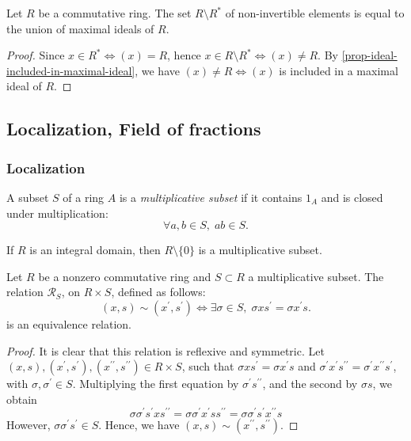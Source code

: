 \documentclass[12pt]{report}
\begin{document}
\begin{corollary} \label{cor-invertible-element-in-maximal-ideal}
    Let $R$ be a commutative ring. The set $R \setminus R^{\ast}$ of non-invertible elements is equal to the union of maximal ideals of $R$.
\end{corollary}

\begin{proof}
    Since $x \in R^{\ast} \iff (x) = R$, hence $x \in R \setminus R^{\ast} \iff (x) \neq R$. By \ref{prop-ideal-included-in-maximal-ideal}, we have $(x) \neq R \iff (x)$ is included in a maximal ideal of $R$.
\end{proof}

\subsection{Localization, Field of fractions}
\subsubsection{Localization}

\begin{definition} \label{def-ring-multiplicative-subset}
    A subset $S$ of a ring $A$ is a \emph{multiplicative subset} if it contains $1_A$ and is closed under multiplication:
    \[
        \forall a, b \in S, \; ab \in S.
    \]
\end{definition}

\begin{remark}
    If $R$ is an integral domain, then $R \setminus \lbrace 0 \rbrace$ is a multiplicative subset.
\end{remark}

\begin{proposition} \label{prop-ring-localization-relation}
    Let $R$ be a nonzero commutative ring and $S \subset R$ a multiplicative subset. The relation $\mathcal{R}_S$, on $R \times S$, defined as follows:
    \[
        (x, s) \sim (x^{\prime}, s^{\prime}) \iff \exists \sigma \in S, \; \sigma x s^{\prime} = \sigma x^{\prime} s.
    \]
    is an equivalence relation.
\end{proposition}

\begin{proof}
    It is clear that this relation is reflexive and symmetric. Let $(x, s), (x^{\prime}, s^{\prime}), (x^{\prime \prime}, s^{\prime \prime}) \in R \times S$, such that $\sigma x s^{\prime} = \sigma x^{\prime} s$ and $\sigma^{\prime} x^{\prime} s^{\prime \prime} = \sigma^{\prime} x^{\prime \prime} s^{\prime}$, with $\sigma, \sigma^{\prime} \in S$. Multiplying the first equation by $\sigma^{\prime} s^{\prime \prime}$, and the second by $\sigma s$, we obtain
    \[
        \sigma \sigma^{\prime} s^{\prime} x s^{\prime \prime} = \sigma \sigma^{\prime} x^{\prime} s s^{\prime \prime} = \sigma \sigma^{\prime} s^{\prime} x^{\prime \prime} s 
    \]
    However, $\sigma \sigma^{\prime} s^{\prime} \in S$. Hence, we have $(x, s) \sim (x^{\prime \prime}, s^{\prime \prime})$.
\end{proof}
\end{document}

